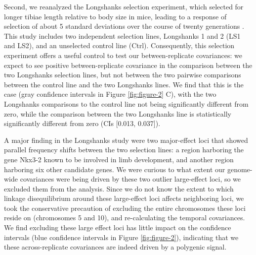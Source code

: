 \documentclass[11pt]{article}
\newcommand{\gc}[1]{{\it \color{red} #1 } }
\begin{document}

Second, we reanalyzed the Longshanks selection experiment, which selected for
longer tibiae length relative to body size in mice, leading to a response of
selection of about 5 standard deviations over the course of twenty generations
\parencite{Castro2019-uk}. This study includes two independent selection lines,
Longshanks 1 and 2 (LS1 and LS2), and an unselected control line (Ctrl).
Consequently, this selection experiment offers a useful control to test our
between-replicate covariances: we expect to see positive between-replicate
covariance in the comparison between the two Longshanks selection lines, but
not between the two pairwise comparisons between the control line and the two
Longshanks lines. We find that this is the case (gray confidence intervals in
Figure \ref{fig:figure-2} C), with the two Longshanks comparisons to the
control line not being significantly different from zero, while the comparison
between the two Longshanks line is statistically significantly different from
zero (CIs [0.013, 0.037]).

A major finding in the Longshanks study were two major-effect loci that showed
parallel frequency shifts between the two selection lines: a region harboring
the gene Nkx3-2 known to be involved in limb development, and another region
harboring six other candidate genes. We were curious to what extent our
genome-wide covariances were being driven by these two outlier large-effect
loci, so we excluded them from the analysis. Since we do not know the extent to
which linkage disequilibrium around these large-effect loci affects neighboring
loci, we took the conservative precaution of excluding the entire chromosomes
these loci reside on (chromosomes 5 and 10), and re-calculating the temporal
covariances. We find excluding these large effect loci has little impact on the
confidence intervals (blue confidence intervals in Figure \ref{fig:figure-2}),
indicating that we these across-replicate covariances are indeed driven by a
polygenic signal.

\end{document}
